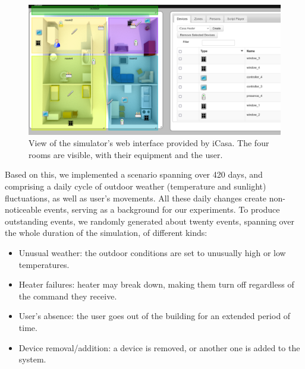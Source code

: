 \documentclass[conference]{IEEEtran}
\begin{document}
\begin{figure}[ht]
  \centering
  \includegraphics[width=\linewidth]{figures/simulator}
  \caption{View of the simulator's web interface provided by iCasa. The four
    rooms are visible, with their equipment and the user.}
  \label{fig:view}
\end{figure}

Based on this, we implemented a scenario spanning over 420 days, and
comprising a daily cycle of outdoor weather (temperature and sunlight) fluctuations, as well
as user's movements. All these daily changes create non-noticeable events,
serving as a background for our experiments. To produce outstanding
events, we randomly generated about twenty events, spanning over the whole
duration of the simulation, of different kinds:

\begin{itemize}
\item Unusual weather: the outdoor conditions are set to unusually high or
        low temperatures.
\item Heater failures: heater may break down, making them turn off regardless
        of the command they receive.
\item User's absence: the user goes out of the building for an extended
        period of time.
\item Device removal/addition: a device is removed, or another one is added
        to the system.
\end{itemize}
\end{document}
